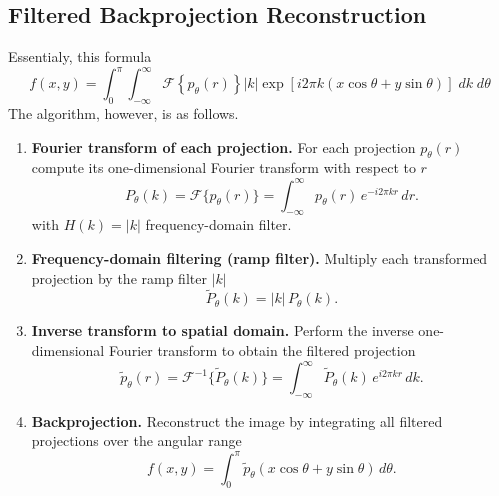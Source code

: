 \documentclass[../../../main.tex]{subfiles}
\begin{document}
\subsection{Filtered Backprojection Reconstruction}
Essentialy, this formula
\begin{equation*}
    f(x,y) = \int_{0}^{\pi}\int_{-\infty }^{\infty}\mathcal{F} \left\{ p_\theta(r) \right\} |k| \exp \left[{i 2\pi k (x\cos\theta + y\sin\theta)}\right] \; dk \; d\theta
\end{equation*}
The algorithm, however, is as follows.
\begin{enumerate}
    \item \textbf{Fourier transform of each projection.}
          For each projection $p_\theta(r)$ compute its one-dimensional Fourier transform with respect to $r$
          \[
              P_{\theta}(k) = \mathcal{F}\{p_{\theta}(r)\}
              = \int_{-\infty}^{\infty} p_{\theta}(r)\, e^{-i2\pi kr}\,dr.
          \]
          with $H(k)=|k|$ frequency-domain filter.

    \item \textbf{Frequency-domain filtering (ramp filter).} Multiply each transformed projection by the ramp filter $|k|$
          \[
              \tilde{P}_{\theta}(k) = |k|\, P_{\theta}(k).
          \]

    \item \textbf{Inverse transform to spatial domain.}
          Perform the inverse one-dimensional Fourier transform to obtain the filtered projection
          \[
              \tilde{p}_{\theta}(r) = \mathcal{F}^{-1}\{\tilde{P}_{\theta}(k)\}
              = \int_{-\infty}^{\infty} \tilde{P}_{\theta}(k)\, e^{i2\pi kr}\,dk.
          \]

    \item \textbf{Backprojection.} Reconstruct the image by integrating all filtered projections over the angular range
          \[
              f(x,y) = \int_{0}^{\pi}
              \tilde{p}_{\theta}(x\cos\theta + y\sin\theta)\, d\theta.
          \]
\end{enumerate}
\end{document}
